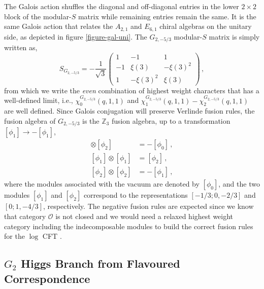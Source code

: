 \documentclass[a4paper,12pt]{article}
\begin{document}
The Galois action shuffles the diagonal and off-diagonal entries in the lower $2\times 2$ block of the modular-$S$ matrix while remaining entries remain the same. It is the same Galois action that relates the $A_{2,1}$ and $E_{6,1}$ chiral algebras on the unitary side, as depicted in figure \eqref{figure-gal-uni}. The $G_{2,-5/3}$ modular-$S$ matrix is simply written as,
\begin{equation}\label{g2_-5_3_s-matrix}
  S_{G_{2,-5/3}}=-\frac{1}{\sqrt 3}\begin{pmatrix}
1 & -1 &1\\
-1 & \xi(3) & -\xi(3)^2 \\
1 & -\xi(3)^2 & \xi(3)
\end{pmatrix}\, ,
\end{equation}
from which we write the \textit{even} combination of highest weight characters that has a well-defined limit, i.e., $\chi_{0}^{G_{2,-5/3}}(q,1,1)$ and $\chi_{ 1}^{G_{2,-5/3}}(q,1,1)-\chi_{ 2}^{G_{2,-5/3}}(q,1,1)$ are well defined. Since Galois conjugation will preserve Verlinde fusion rules, the fusion algebra of $G_{2,-5/3}$ is the $\mathbb{Z}_3$ fusion algebra, up to a transformation $[\phi_1]\to -[\phi_1]$,
\begin{align}
    [\phi_1]\otimes [\phi_2]&=-[\phi_0]\, ,\nonumber\\
    [\phi_1]\otimes [\phi_1]&=[\phi_2]\, ,\nonumber\\
    [\phi_2]\otimes [\phi_2]&=-[\phi_1]\, ,   
\end{align}
where the modules associated with the vacuum are denoted by $[\phi_0]$, and the two modules $[\phi_1]$ and $[\phi_2]$ correspond to the representations $[-1/3;0,-2/3]$ and $[0;1,-4/3]$, respectively. The negative fusion rules are expected since we know that category $\mathcal{O}$ is not closed and we would need a relaxed highest weight category including the indecomposable modules to build the correct fusion rules for the $\log$ CFT \cite{Ridout:2014yfa}.


\subsection{\ensuremath{G_2} Higgs Branch from Flavoured Correspondence}
\end{document}
